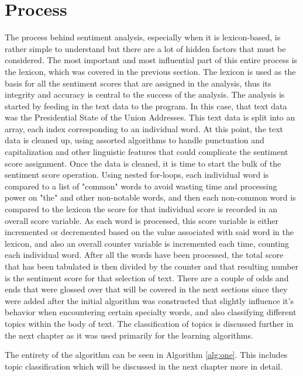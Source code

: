 \section{Process}
The process behind sentiment analysis, especially when it is lexicon-based, is rather simple to understand but there are a lot of hidden factors that must be considered.
The most important and most influential part of this entire process is the lexicon, which was covered in the previous section.
The lexicon is used as the basis for all the sentiment scores that are assigned in the analysis, thus its integrity and accuracy is central to the success of the analysis.
The analysis is started by feeding in the text data to the program. 
In this case, that text data was the Presidential State of the Union Addresses.
This text data is split into an array, each index corresponding to an individual word.
At this point, the text data is cleaned up, using assorted algorithms to handle punctuation and capitalization and other linguistic features that could complicate the sentiment score assignment.
Once the data is cleaned, it is time to start the bulk of the sentiment score operation.
Using nested for-loops, each individual word is compared to a list of "common" words to avoid wasting time and processing power on "the" and other non-notable words, and then each non-common word is compared to the lexicon the score for that individual score is recorded in an overall score variable.
As each word is processed, this score variable is either incremented or decremented based on the value associated with said word in the lexicon, and also an overall counter variable is incremented each time, counting each individual word.
After all the words have been processed, the total score that has been tabulated is then divided by the counter and that resulting number is the sentiment score for that selection of text.
There are a couple of odds and ends that were glossed over that will be covered in the next sections since they were added after the initial algorithm was constructed that slightly influence it's behavior when encountering certain specialty words, and also classifying different topics within the body of text.
The classification of topics is discussed further in the next chapter as it was used primarily for the learning algorithms.

The entirety of the algorithm can be seen in Algorithm \ref{alg:one}.
This includes topic classification which will be discussed in the next chapter more in detail.

